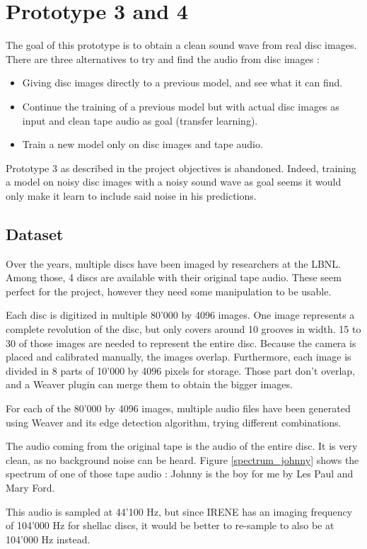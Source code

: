 \documentclass[12pt, twoside]{article}
\begin{document}
\section{Prototype 3 and 4}
The goal of this prototype is to obtain a clean sound wave from real disc images. There are three alternatives to try and find the audio from disc images :
\begin{itemize}
	\item Giving disc images directly to a previous model, and see what it can find.
	\item Continue the training of a previous model but with actual disc images as input and clean tape audio as goal (transfer learning).
	\item Train a new model only on disc images and tape audio.
\end{itemize}

Prototype 3 as described in the project objectives is abandoned. Indeed, training a model on noisy disc images with a noisy sound wave as goal seems it would only make it learn to include said noise in his predictions.
\subsection{Dataset}
Over the years, multiple discs have been imaged by researchers at the LBNL. Among those, 4 discs are available with their original tape audio. These seem perfect for the project, however they need some manipulation to be usable.

Each disc is digitized in multiple 80'000 by 4096 images. One image represents a complete revolution of the disc, but only covers around 10 grooves in width. 15 to 30 of those images are needed to represent the entire disc. Because the camera is placed and calibrated manually, the images overlap. Furthermore, each image is divided in 8 parts of 10'000 by 4096 pixels for storage. Those part don't overlap, and a Weaver plugin can merge them to obtain the bigger images.

For each of the 80'000 by 4096 images, multiple audio files have been generated using Weaver and its edge detection algorithm, trying different combinations.

The audio coming from the original tape is the audio of the entire disc. It is very clean, as no background noise can be heard. Figure \ref{spectrum_johnny} shows the spectrum of one of those tape audio : Johnny is the boy for me by Les Paul and Mary Ford. 

This audio is sampled at 44'100 Hz, but since IRENE has an imaging frequency of 104'000 Hz for shellac discs, it would be better to re-sample to also be at 104'000 Hz instead.
\end{document}
